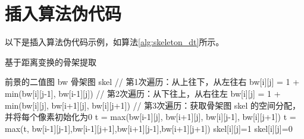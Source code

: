 



\section{插入算法伪代码}
以下是插入算法伪代码示例，如算法\ref{alg:skeleton_dt}所示。

\begin{algorithm}[!htb]
\caption{基于距离变换的骨架提取}
\label{alg:skeleton_dt}
\begin{algorithmic}[1]
\Require 前景的二值图 bw  
\Ensure 骨架图 skel
\State // 第1次遍历：从上往下，从左往右
 
     
        \State bw[i][j] = 1 + min(bw[i][j-1], bw[i-1][j])   
    \EndFor
\EndFor
\State // 第2次遍历：从下往上，从右往左
        \State bw[i][j] = 1 + min(bw[i][j], bw[i+1][j], bw[i][j+1])
    \EndFor
\EndFor
\State // 第3次遍历：获取骨架图
\State skel 的空间分配，并将每个像素初始化为0
        \State t = max(bw[i-1][j], bw[i+1][j], bw[i][j-1], bw[i][j+1])   
        \State t = max(t, bw[i-1][j-1],bw[i-1][j+1],bw[i+1][j-1],bw[i+1][j+1])
        	\State skel[i][j]=1  
        \Else 
        	\State skel[i][j]=0
        \EndIf
    \EndFor
\EndFor
\end{algorithmic}
\end{algorithm}
